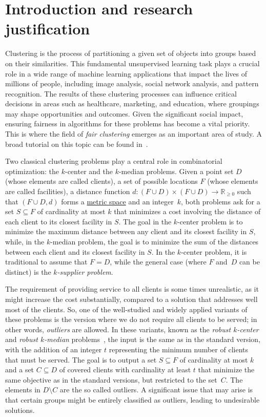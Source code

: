 \documentclass[12pt]{article}
\begin{document}
\section{Introduction and research justification} %
Clustering is the process of partitioning a given set of objects into groups based on their similarities. 
This fundamental unsupervised learning task plays a crucial role in a wide range of machine learning applications that impact the lives of millions of people, including image analysis, social network analysis, and pattern recognition. 
The results of these clustering processes can influence critical decisions in areas such as healthcare, marketing, and education, where groupings may shape opportunities and outcomes.
Given the significant social impact, ensuring fairness in algorithms for these problems has become a vital priority. 
This is where the field of \emph{fair clustering} emerges as an important area of study.
A broad tutorial on this topic can be found in~\cite{FairClusteringTutorial}.

Two classical clustering problems play a central role in combinatorial optimization: the $k$-center and the $k$-median problems. 
Given a point set $D$ (whose elements are called clients), a set of possible locations $F$ (whose elements are called facilities), a distance function $d : (F \cup D) \times (F \cup D) \rightarrow \mathbb{R}_{\geq 0}$ such that $(F\cup D, d)$ forms a \href{https://en.wikipedia.org/wiki/Metric_space}{metric space} and an integer~$k$, both problems ask for a set $S \subseteq F$ of cardinality at most $k$ that minimizes a cost involving the distance of each client to its closest facility in $S$.
The goal in the $k$-center problem is to minimize the maximum distance between any client and its closest facility in $S$, while, in the $k$-median problem, the goal is to minimize the sum of the distances between each client and its closest facility in $S$.
In the $k$-center problem, it is traditional to assume that $F=D$, while the general case (where $F$ and~$D$ can be distinct) is the \emph{$k$-supplier problem}.

The requirement of providing service to all clients is some times unrealistic, as it might increase the cost substantially, compared to a solution that addresses well most of the clients. 
So, one of the well-studied and widely applied variants of these problems is the version where we do not require all clients to be served; in other words, \emph{outliers} are allowed. 
In these variants, known as the \emph{robust $k$-center} and \emph{robust $k$-median} problems~\cite{CharikarKMN2001}, the input is the same as in the standard version, with the addition of an integer $t$ representing the minimum number of clients that must be served. 
The goal is to output a set $S \subseteq F$ of cardinality at most $k$ and a set $C \subseteq D$ of covered clients with cardinality at least $t$ that minimize the same objective as in the standard versions, but restricted to the set~$C$.  The elements in $D \setminus C$ are the so called outliers.  A significant issue that may arise is that certain groups might be entirely classified as outliers, leading to undesirable solutions.
\end{document}
